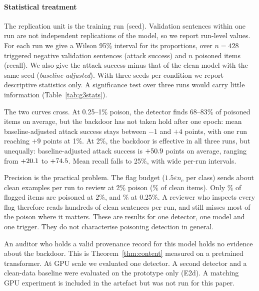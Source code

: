 \paragraph{Statistical treatment}
The replication unit is the training run (seed). Validation sentences within one run are not
independent replications of the model, so we report run-level values. For each run we give a
Wilson 95\% interval for its proportions, over $n=428$ triggered negative validation sentences
(attack success) and $n$ poisoned items (recall). We also give the attack success minus that of
the clean model with the same seed (\emph{baseline-adjusted}). With three seeds per condition
we report descriptive statistics only. A significance test over three runs would carry little
information (Table~\ref{tab:g3stats}).

The two curves cross. At 0.25--1\% poison, the detector finds 68--83\% of poisoned items on
average, but the backdoor has not taken hold after one epoch: mean baseline-adjusted attack
success stays between $-1$ and $+4$ points, with one run reaching $+9$ points at 1\%. At 2\%, the backdoor is effective in all three
runs, but unequally: baseline-adjusted attack success is $+50.9$ points on average,
ranging from $+20.1$ to $+74.5$. Mean recall falls to 25\%, with
wide per-run intervals.

Precision is the practical problem. The flag budget ($1.5\varepsilon n_c$ per class) sends
about \GthreeFPHigh{} clean examples per run to review at 2\% poison
(\GthreeFPRHigh\% of clean items). Only \GthreePrecHigh\% of flagged items are poisoned at 2\%,
and \GthreePrecLow\% at 0.25\%. A reviewer who inspects every flag therefore reads hundreds of
clean sentences per run, and still misses most of the poison where it matters. These are
results for one detector, one model and one trigger. They do not characterise poisoning
detection in general.

An auditor who holds a valid provenance record for this model holds no evidence about the
backdoor. This is Theorem~\ref{thm:content} measured on a pretrained transformer.
At GPU scale we evaluated one detector. A second detector and a clean-data baseline were
evaluated on the prototype only (E2d). A matching GPU experiment is included in the artefact
but was not run for this paper.

\begin{table}[t]
\centering\scriptsize
\caption{G3 summary: authorised-source backdoor poison, DistilBERT on SST-2 (3 seeds; mean
and range). Attack success over $n=428$ triggered negative sentences per run; clean accuracy
over $n=872$.}\label{tab:g3}
\end{table}

